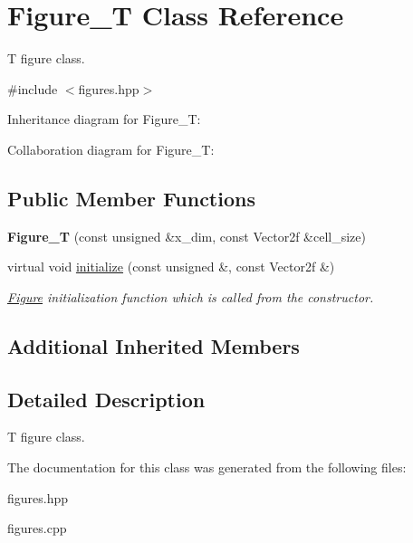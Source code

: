 \hypertarget{classFigure__T}{}\section{Figure\+\_\+T Class Reference}
\label{classFigure__T}


T figure class.  




{\ttfamily \#include $<$figures.\+hpp$>$}



Inheritance diagram for Figure\+\_\+T\+:


Collaboration diagram for Figure\+\_\+T\+:
\subsection*{Public Member Functions}
\begin{DoxyCompactItemize}
\item 
\mbox{\label{classFigure__T_aceeb4c507b9c5c510c510dfa325446db}} 
{\bfseries Figure\+\_\+T} (const unsigned \&x\+\_\+dim, const Vector2f \&cell\+\_\+size)
\item 
\mbox{\label{classFigure__T_a9b77e65cdb1bc5dced1a76bc587d9d19}} 
virtual void \hyperlink{classFigure__T_a9b77e65cdb1bc5dced1a76bc587d9d19}{initialize} (const unsigned \&, const Vector2f \&)
\begin{DoxyCompactList}\small\item\em \hyperlink{classFigure}{Figure} initialization function which is called from the constructor. \end{DoxyCompactList}\end{DoxyCompactItemize}
\subsection*{Additional Inherited Members}


\subsection{Detailed Description}
T figure class. 

The documentation for this class was generated from the following files\+:\begin{DoxyCompactItemize}
\item 
figures.\+hpp\item 
figures.\+cpp\end{DoxyCompactItemize}

